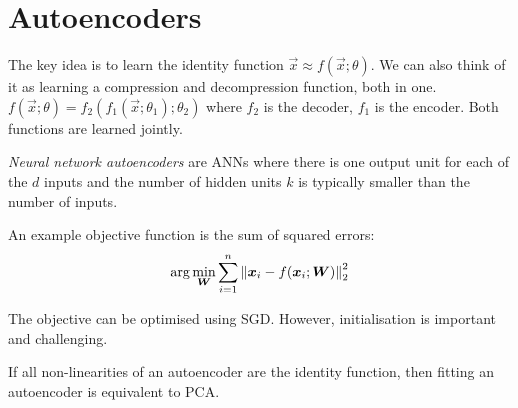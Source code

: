 \section{Autoencoders}
The key idea is to learn the identity function
$\vec{x} \approx f(\vec{x}; \theta)$.
We can also think of it as learning a
compression and decompression function, both in one.
$f(\vec{x};\theta) = f_2(f_1(\vec{x};\theta_1);\theta_2)$ where
$f_2$ is the decoder, $f_1$ is the encoder.
Both functions are learned jointly.

\emph{Neural network autoencoders} are ANNs where
there is one output unit for each of the $d$ inputs
and the number of hidden units $k$ is typically smaller
than the number of inputs.

An example objective function is the sum of squared errors:
\begin{equation*}
    \arg\min_{\boldsymbol{W}}{
        \sum_{i=1}^n{
            \left\lVert\boldsymbol{x}_i - f(\boldsymbol{x}_i; \boldsymbol{W})\right\rVert_2^2
        }
    }
\end{equation*}

The objective can be optimised using SGD.
However, initialisation is important and challenging.

If all non-linearities of an autoencoder
are the identity function,
then fitting an autoencoder is equivalent to PCA.
